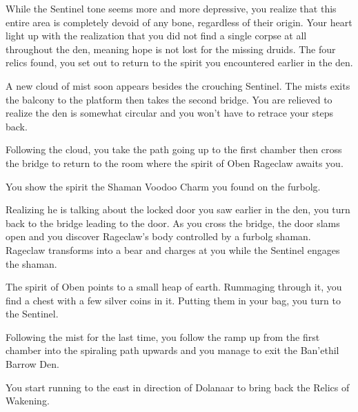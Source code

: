 While the Sentinel tone seems more and more depressive, you realize that this entire area is completely devoid of any bone, regardless of their origin. Your heart light up with the realization that you did not find a single corpse at all throughout the den, meaning hope is not lost for the missing druids. The four relics found, you set out to return to the spirit you encountered earlier in the den.



A new cloud of mist soon appears besides the crouching Sentinel. The mists exits the balcony to the platform then takes the second bridge. You are relieved to realize the den is somewhat circular and you won't have to retrace your steps back.

Following the cloud, you take the path going up to the first chamber then cross the bridge to return to the room where the spirit of Oben Rageclaw awaits you.



You show the spirit the Shaman Voodoo Charm you found on the furbolg.



Realizing he is talking about the locked door you saw earlier in the den, you turn back to the bridge leading to the door. As you cross the bridge, the door slams open and you discover Rageclaw's body controlled by a furbolg shaman. Rageclaw transforms into a bear and charges at you while the Sentinel engages the shaman. %


The spirit of Oben points to a small heap of earth. Rummaging through it, you find a chest with a few silver coins in it. Putting them in your bag, you turn to the Sentinel.



Following the mist for the last time, you follow the ramp up from the first chamber into the spiraling path upwards and you manage to exit the Ban'ethil Barrow Den.

You start running to the east in direction of Dolanaar to bring back the Relics of Wakening.
